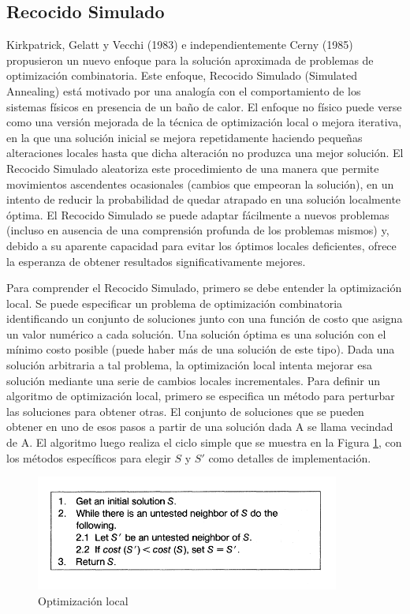\documentclass[a4paper,openright,11pt,oneside]{book}
\begin{document}
	\subsection{Recocido Simulado}
		Kirkpatrick, Gelatt y Vecchi (1983) e independientemente Cerny (1985) propusieron un nuevo enfoque para la solución aproximada de problemas de optimización combinatoria. Este enfoque, Recocido Simulado \cite{RecocidoSimulado} (Simulated Annealing) está motivado por una analogía con el comportamiento de los sistemas físicos en presencia de un baño de calor. El enfoque no físico puede verse como una versión mejorada de la técnica de optimización local o mejora iterativa, en la que una solución inicial se mejora repetidamente haciendo pequeñas alteraciones locales hasta que dicha alteración no produzca una mejor solución. El Recocido Simulado aleatoriza este procedimiento de una manera que permite movimientos ascendentes ocasionales (cambios que empeoran la solución), en un intento de reducir la probabilidad de quedar atrapado en una solución localmente óptima. El Recocido Simulado se puede adaptar fácilmente a nuevos problemas (incluso en ausencia de una comprensión profunda de los problemas mismos) y, debido a su aparente capacidad para evitar los óptimos locales deficientes, ofrece la esperanza de obtener resultados significativamente mejores.
		
		Para comprender el Recocido Simulado, primero se debe entender la optimización local. Se puede especificar un problema de optimización combinatoria identificando un conjunto de soluciones junto con una función de costo que asigna un valor numérico a cada solución. Una solución óptima es una solución con el mínimo costo posible (puede haber más de una solución de este tipo). Dada una solución arbitraria a tal problema, la optimización local intenta mejorar esa solución mediante una serie de cambios locales incrementales. Para definir un algoritmo de optimización local, primero se especifica un método para perturbar las soluciones para obtener otras. El conjunto de soluciones que se pueden obtener en uno de esos pasos a partir de una solución dada A se llama vecindad de A. El algoritmo luego realiza el ciclo simple que se muestra en la Figura \ref{OptLocalRS}, con los métodos específicos para elegir $S$ y $S'$ como detalles de implementación.
		
		\begin{figure}[h]
		\centering
		\includegraphics[width=10cm]{./Graphics/RecocidoSimuladoOptLocal.png}
		\caption{Optimización local \cite{RecocidoSimulado}}
		\label{OptLocalRS}
		\end{figure}
		
\end{document}
